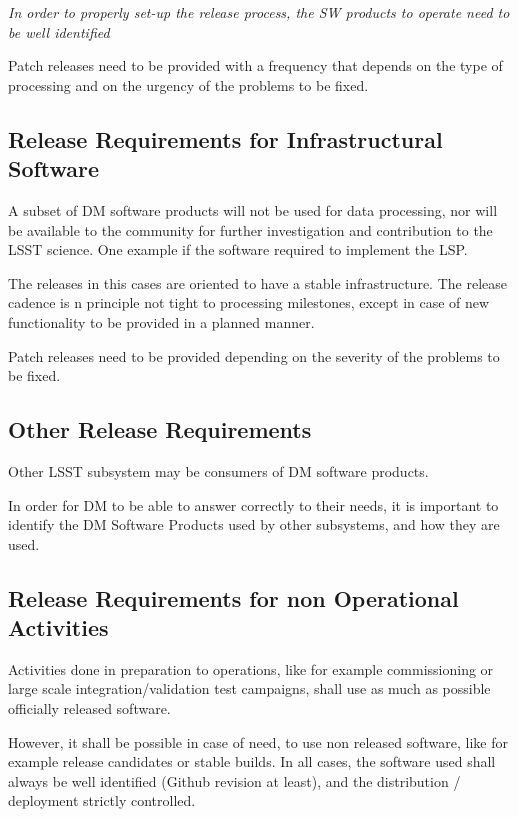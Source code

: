 \textit{In order to properly set-up the release process, the \gls{SW} products to operate need to be well identified}

Patch releases need to be provided with a frequency that depends on the type of processing
and on the urgency of the problems to be fixed.


\subsection{Release Requirements for Infrastructural Software} \label{sec:infreqs}

A subset of \gls{DM} software products will not be used for data processing,
nor will be available to the community for further investigation and contribution to the \gls{LSST} science.
One example if the software required to implement the \gls{LSP}.

The releases in this cases are oriented to have a stable infrastructure.
The release cadence is n principle not tight to processing milestones,
except in case of new functionality to be provided in a planned manner.

Patch releases need to be provided depending on the severity of the problems to be fixed.


\subsection{Other Release Requirements} \label{sec:otherreqs}

Other \gls{LSST} subsystem may be consumers of \gls{DM} software products.

In order for \gls{DM} to be able to answer correctly to their needs,
it is important to identify the \gls{DM} Software Products used by other subsystems,
and how they are used.


\subsection{Release Requirements for non Operational Activities} \label{sec:nonopsreqs}

Activities done in preparation to operations, like for example commissioning or 
large scale integration/validation test campaigns, shall use as much as possible officially released software.

However, it shall be possible in case of need, to use non released software, like for example release candidates or stable builds.
In all cases, the software used shall always be well identified (Github revision at least), and the distribution / deployment strictly controlled.







